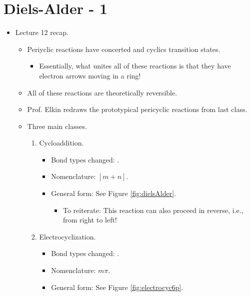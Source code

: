 \documentclass[../notes.tex]{subfiles}
\begin{document}
% 



\section{Diels-Alder - 1}
\begin{itemize}
    \item {}Lecture 12 recap.
    \begin{itemize}
        \item Periyclic reactions have concerted and cyclics transition states.
        \begin{itemize}
            \item Essentially, what unites all of these reactions is that they have electron arrows moving in a ring!
        \end{itemize}
        \item All of these reactions are theoretically reversible.
        \item Prof. Elkin redraws the prototypical pericyclic reactions from last class.
        \pagebreak
        \item Three main classes.
        \begin{enumerate}
            \item Cycloaddition.
            \begin{itemize}
                \item Bond types changed: \ce{$2\pi$ <=> $2\sigma$}.
                \item Nomenclature: $[m+n]$.
                \item General form: See Figure \ref{fig:dielsAlder}.
                \begin{itemize}
                    \item To reiterate: This reaction can also proceed in reverse, i.e., from right to left!
                \end{itemize}
            \end{itemize}
            \item Electrocyclization.
            \begin{itemize}
                \item Bond types changed: \ce{$1\pi$ <=> $1\sigma$}.
                \item Nomenclature: $m\pi$.
                \item General form: See Figure \ref{fig:electrocyc6p}.
                \begin{itemize}

\end{itemize}
\end{itemize}
\end{enumerate}
\end{itemize}
\end{itemize}
\end{document}
